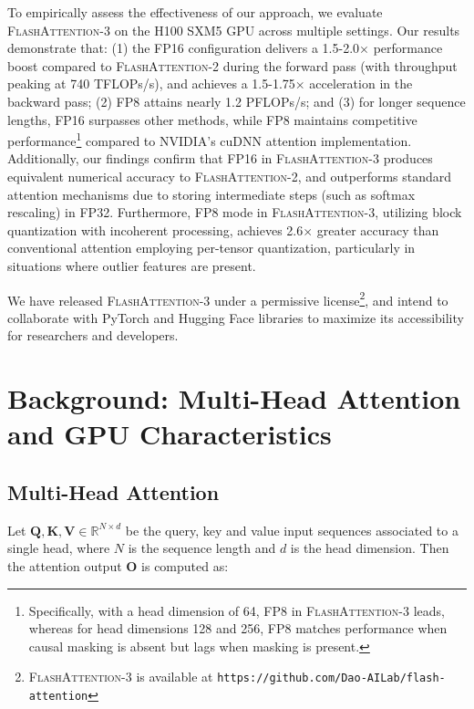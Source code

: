To empirically assess the effectiveness of our approach, we evaluate \textsc{FlashAttention-3} on the H100 SXM5 GPU across multiple settings. Our results demonstrate that: (1) the FP16 configuration delivers a 1.5-2.0$\times$ performance boost compared to \textsc{FlashAttention-2} during the forward pass (with throughput peaking at 740 TFLOPs/s), and achieves a 1.5-1.75$\times$ acceleration in the backward pass; (2) FP8 attains nearly 1.2 PFLOPs/s; and (3) for longer sequence lengths, FP16 surpasses other methods, while FP8 maintains competitive performance\footnote{Specifically, with a head dimension of 64, FP8 in \textsc{FlashAttention-3} leads, whereas for head dimensions 128 and 256, FP8 matches performance when causal masking is absent but lags when masking is present.} compared to NVIDIA’s cuDNN attention implementation. Additionally, our findings confirm that FP16 in \textsc{FlashAttention-3} produces equivalent numerical accuracy to \textsc{FlashAttention-2}, and outperforms standard attention mechanisms due to storing intermediate steps (such as softmax rescaling) in FP32. Furthermore, FP8 mode in \textsc{FlashAttention-3}, utilizing block quantization with incoherent processing, achieves 2.6$\times$ greater accuracy than conventional attention employing per-tensor quantization, particularly in situations where outlier features are present.

We have released \textsc{FlashAttention-3} under a permissive license\footnote{\textsc{FlashAttention-3}
  is available at \texttt{https://github.com/Dao-AILab/flash-attention}}, and intend to collaborate with PyTorch and Hugging Face libraries to maximize its accessibility for researchers and developers.

\section{Background: Multi-Head Attention and GPU Characteristics}
\label{sec:background}

\subsection{Multi-Head Attention}
\label{subsec:multi_head_attn}

Let $\mathbf{Q}, \mathbf{K}, \mathbf{V} \in \mathbb{R}^{N \times d}$ be the query, key and value input sequences associated to a single head, where $N$ is the sequence length and $d$ is the head dimension. Then the attention output $\mathbf{O}$ is computed as:

